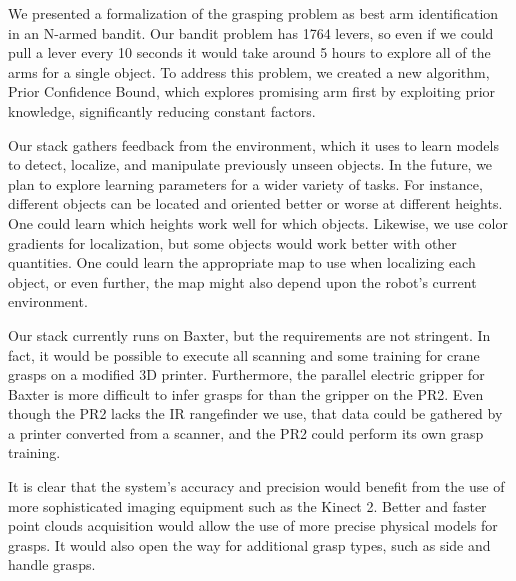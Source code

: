 \documentclass{article}
\newcommand{\stnote}[1]{\textcolor{blue}{\textbf{ST: #1}}}
\newcommand{\algorithmDTxt}{Prior Confidence Bound\xspace}
\begin{document}
\label{sec:conclusion}


We presented a formalization of the grasping problem as best arm
identification in an N-armed bandit.  Our bandit problem has 1764
levers, so even if we could pull a lever every 10 seconds it would
take around 5 hours to explore all of the arms for a single object.
To address this problem, we created a new algorithm, \algorithmDTxt,
which explores promising arm first by exploiting prior knowledge,
significantly reducing constant factors. 

Our stack gathers feedback from the environment, which it uses to
learn models to detect, localize, and manipulate previously unseen
objects. In the future, we plan to explore learning parameters for a
wider variety of tasks.  For instance, different objects can be
located and oriented better or worse at different heights. One could
learn which heights work well for which objects.  Likewise, we use
color gradients for localization, but some objects would work better
with other quantities. One could learn the appropriate map to use when
localizing each object, or even further, the map might also depend
upon the robot's current environment.


Our stack currently runs on Baxter, but the requirements are not
stringent.  In fact, it would be possible to execute all scanning and
some training for crane grasps on a modified 3D printer. Furthermore,
the parallel electric gripper for Baxter is more difficult to infer
grasps for than the gripper on the PR2.  Even though the PR2 lacks the
IR rangefinder we use, that data could be gathered by a printer
converted from a scanner, and the PR2 could perform its own grasp
training.

It is clear that the system's accuracy and precision would benefit
from the use of more sophisticated imaging equipment such as the
Kinect 2. Better and faster point clouds acquisition would allow the
use of more precise physical models for grasps. It would also open the
way for additional grasp types, such as side and handle grasps.
\end{document}
